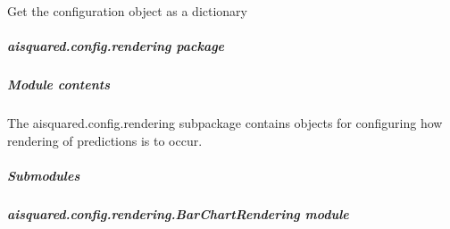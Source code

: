 \documentclass[letterpaper,10pt,english]{sphinxmanual}
\begin{document}
\begin{fulllineitems}
\begin{fulllineitems}
\label{\detokenize{aisquared.config.preprocessing.text:aisquared.config.preprocessing.text.TextPreprocessing.TextPreprocessor.step_dict}}
\pysigstartsignatures
{}
\pysigstopsignatures
\end{fulllineitems}


\begin{fulllineitems}
\label{\detokenize{aisquared.config.preprocessing.text:aisquared.config.preprocessing.text.TextPreprocessing.TextPreprocessor.to_dict}}
\pysigstartsignatures
{}
\pysigstopsignatures
\sphinxAtStartPar
Get the configuration object as a dictionary

\end{fulllineitems}


\end{fulllineitems}


\sphinxstepscope


\subparagraph{aisquared.config.rendering package}
\label{\detokenize{aisquared.config.rendering:aisquared-config-rendering-package}}\label{\detokenize{aisquared.config.rendering::doc}}

\subparagraph{Module contents}
\label{\detokenize{aisquared.config.rendering:module-aisquared.config.rendering}}\label{\detokenize{aisquared.config.rendering:module-contents}}
\sphinxAtStartPar
The aisquared.config.rendering subpackage contains objects for configuring how rendering of predictions is to occur.


\subparagraph{Submodules}
\label{\detokenize{aisquared.config.rendering:submodules}}

\subparagraph{aisquared.config.rendering.BarChartRendering module}
\label{\detokenize{aisquared.config.rendering:module-aisquared.config.rendering.BarChartRendering}}\label{\detokenize{aisquared.config.rendering:aisquared-config-rendering-barchartrendering-module}}
\end{document}
